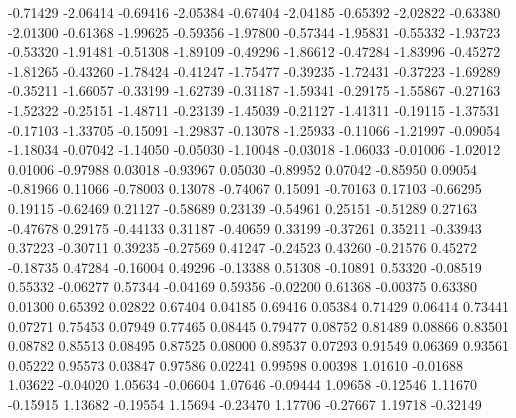           -0.71429 -2.06414
          -0.69416 -2.05384
          -0.67404 -2.04185
          -0.65392 -2.02822
          -0.63380 -2.01300
          -0.61368 -1.99625
          -0.59356 -1.97800
          -0.57344 -1.95831
          -0.55332 -1.93723
          -0.53320 -1.91481
          -0.51308 -1.89109
          -0.49296 -1.86612
          -0.47284 -1.83996
          -0.45272 -1.81265
          -0.43260 -1.78424
          -0.41247 -1.75477
          -0.39235 -1.72431
          -0.37223 -1.69289
          -0.35211 -1.66057
          -0.33199 -1.62739
          -0.31187 -1.59341
          -0.29175 -1.55867
          -0.27163 -1.52322
          -0.25151 -1.48711
          -0.23139 -1.45039
          -0.21127 -1.41311
          -0.19115 -1.37531
          -0.17103 -1.33705
          -0.15091 -1.29837
          -0.13078 -1.25933
          -0.11066 -1.21997
          -0.09054 -1.18034
          -0.07042 -1.14050
          -0.05030 -1.10048
          -0.03018 -1.06033
          -0.01006 -1.02012
          0.01006 -0.97988
          0.03018 -0.93967
          0.05030 -0.89952
          0.07042 -0.85950
          0.09054 -0.81966
          0.11066 -0.78003
          0.13078 -0.74067
          0.15091 -0.70163
          0.17103 -0.66295
          0.19115 -0.62469
          0.21127 -0.58689
          0.23139 -0.54961
          0.25151 -0.51289
          0.27163 -0.47678
          0.29175 -0.44133
          0.31187 -0.40659
          0.33199 -0.37261
          0.35211 -0.33943
          0.37223 -0.30711
          0.39235 -0.27569
          0.41247 -0.24523
          0.43260 -0.21576
          0.45272 -0.18735
          0.47284 -0.16004
          0.49296 -0.13388
          0.51308 -0.10891
          0.53320 -0.08519
          0.55332 -0.06277
          0.57344 -0.04169
          0.59356 -0.02200
          0.61368 -0.00375
          0.63380 0.01300
          0.65392 0.02822
          0.67404 0.04185
          0.69416 0.05384
          0.71429 0.06414
          0.73441 0.07271
          0.75453 0.07949
          0.77465 0.08445
          0.79477 0.08752
          0.81489 0.08866
          0.83501 0.08782
          0.85513 0.08495
          0.87525 0.08000
          0.89537 0.07293
          0.91549 0.06369
          0.93561 0.05222
          0.95573 0.03847
          0.97586 0.02241
          0.99598 0.00398
          1.01610 -0.01688
          1.03622 -0.04020
          1.05634 -0.06604
          1.07646 -0.09444
          1.09658 -0.12546
          1.11670 -0.15915
          1.13682 -0.19554
          1.15694 -0.23470
          1.17706 -0.27667
          1.19718 -0.32149
